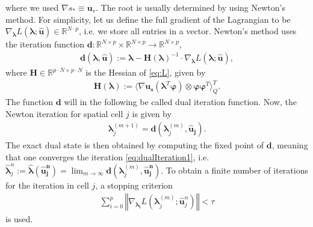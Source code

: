 where we used $\nabla s_* \equiv \bm u_s$. The root is usually determined by using Newton's method. For simplicity, let us define the full gradient of the Lagrangian to be $\nabla_{\bm{\lambda}}L(\bm{\lambda};\bm{\hat{u}})\in\mathbb{R}^{N\cdot p}$, i.e. we store all entries in a vector. Newton's method uses the iteration function $\bm{d}:\mathbb{R}^{N\times p}\times\mathbb{R}^{N\times p}\to\mathbb{R}^{N\times p}$,
\begin{align}\label{eq:dualIterationFunction}
\bm{d}(\bm{\lambda},\bm{\hat{u}}):= \bm{\lambda}-\bm{H}(\bm{\lambda})^{-1}\cdot\nabla_{\bm{\lambda}}L(\bm{\lambda};\bm{\hat{u}}),
\end{align}
where $\bm H\in\mathbb{R}^{p\cdot N\times p\cdot N}$ is the Hessian of \eqref{eq:L}, given by
\begin{align*}
\bm{H}(\bm{\lambda}) := \langle \nabla \bm{u}_{\bm{s}} (\bm{\lambda}^T\bm{\varphi})\otimes\bm{\varphi}\bm{\varphi}^T\rangle_Q^{T}.
\end{align*}
The function $\bm d$ will in the following be called dual iteration function. Now, the Newton iteration for spatial cell $j$ is given by
\begin{align}\label{eq:dualIteration1}
\bm{\lambda}^{(m+1)}_j = \bm{d}(\bm{\lambda}_j^{(m)},\bm{\hat{u}_j}).
\end{align}
The exact dual state is then obtained by computing the fixed point of $\bm{d}$, meaning that one converges the iteration \eqref{eq:dualIteration1}, i.e. $\bm{\hat\lambda}_j^n:=\bm{\hat\lambda}(\bm{\hat u_j^n})=\lim_{m\rightarrow\infty}\bm{d}(\bm{\lambda}_j^{(m)},\bm{\hat{u}_j^n})$.
To obtain a finite number of iterations for the iteration in cell $j$, a stopping criterion 
\begin{align}\label{eq:tauCrit}
\sum_{i=0}^p\left\Vert \nabla_{\bm{\lambda_i}}L(\bm{\lambda}_j^{(m)};\bm{\hat{u}}_j^n) \right\Vert < \tau
\end{align}
is used.

